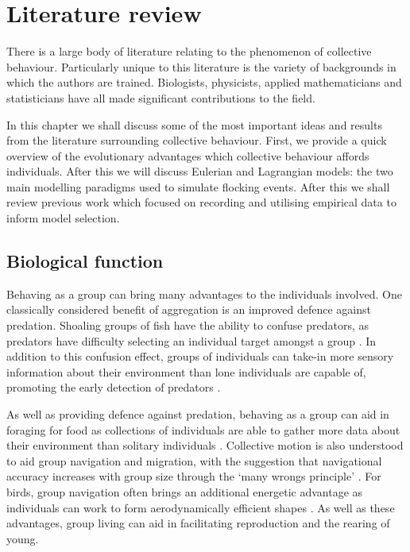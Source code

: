 \graphicspath{{fig/lit_review/}}

\chapter{Literature review}
\label{cha:lit_review}

There is a large body of literature relating to the phenomenon of collective behaviour.
Particularly unique to this literature is the variety of backgrounds in which the authors
are trained. Biologists, physicists, applied mathematicians and statisticians have all
made significant contributions to the field.

In this chapter we shall discuss some of the most important ideas and results from the
literature surrounding collective behaviour. First, we provide a quick overview of the
evolutionary advantages which collective behaviour affords individuals. After this we will
discuss Eulerian and Lagrangian models: the two main modelling paradigms used to simulate
flocking events. After this we shall review previous work which focused on recording and
utilising empirical data to inform model selection.

\section{Biological function}
\label{sec:biological_function}

Behaving as a group can bring many advantages to the individuals involved. One classically
considered benefit of aggregation is an improved defence against predation. Shoaling
groups of fish have the ability to confuse predators, as predators have difficulty
selecting an individual target amongst a group \parencite{landeau86}. In addition to this
confusion effect, groups of individuals can take-in more sensory information about their
environment than lone individuals are capable of, promoting the early detection of
predators \parencite{pitcher93}.

As well as providing defence against predation, behaving as a group can aid in foraging
for food as collections of individuals are able to gather more data about their
environment than solitary individuals \parencite{clark86}. Collective motion is
also understood to aid group navigation and migration, with the suggestion that
navigational accuracy increases with group size through the `many wrongs principle'
\parencite{simmons04}. For birds, group navigation often brings an additional energetic
advantage as individuals can work to form aerodynamically efficient shapes
\parencite{weimerskirch01}. As well as these advantages, group living can aid in
facilitating reproduction and the rearing of young.


